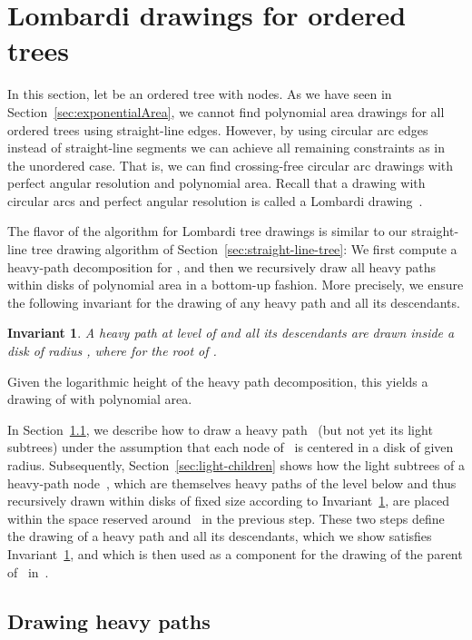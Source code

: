 \documentclass[11pt]{article}
\newtheorem{invariant}{Invariant}
\begin{document}
\section{Lombardi drawings for ordered trees}
\label{sec:lombardi}

In this section, let  be an ordered tree with  nodes. As we have
seen in Section~\ref{sec:exponentialArea}, we cannot find polynomial
area drawings for all ordered trees using straight-line edges. 
However, by using circular arc edges instead of straight-line segments we can achieve all remaining constraints as in the unordered case.
That is, we can find crossing-free circular
arc drawings with perfect angular resolution and polynomial area. Recall that a drawing with circular arcs and perfect angular resolution is called a
Lombardi drawing~\cite{degkn-ldg-12}.

The flavor of the algorithm for Lombardi tree drawings is similar to
our straight-line tree drawing algorithm of
Section~\ref{sec:straight-line-tree}: We first compute a heavy-path
decomposition  for , and then we recursively draw all heavy paths
within disks of polynomial area in a bottom-up fashion. 
More precisely, we ensure the following invariant for the drawing of any heavy path and all its descendants.
\begin{invariant}\label{inv:diskradius}
	A heavy path  at level  of  and all its descendants are drawn inside a disk  of radius , where  for the root  of .
\end{invariant}
Given the logarithmic height of the heavy path decomposition, this yields a drawing of  with polynomial area.


In Section~\ref{sec:lom-heavy-path}, we describe how to draw a heavy path~ (but not yet its light subtrees) under the assumption that each node of~ is centered in a disk of given radius. 
Subsequently, Section~\ref{sec:light-children} shows how the light subtrees of a heavy-path node~, which are themselves heavy paths of the level below and thus recursively drawn within disks of fixed size according to Invariant~\ref{inv:diskradius}, are placed within the space reserved around~ in the previous step.
These two steps define the drawing of a heavy path  and all its descendants, which we show satisfies Invariant~\ref{inv:diskradius}, and which is then used as a component for the drawing of the parent of~ in~.





\subsection{Drawing heavy paths}
\label{sec:lom-heavy-path}
\end{document}
